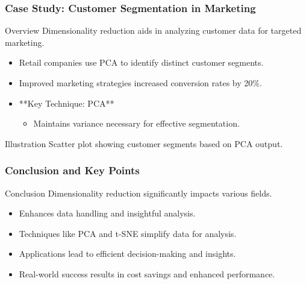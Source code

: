 \documentclass[aspectratio=169]{beamer}
\begin{document}
\begin{frame}[fragile]
    \frametitle{Case Study: Customer Segmentation in Marketing}
    \begin{block}{Overview}
        Dimensionality reduction aids in analyzing customer data for targeted marketing.
    \end{block}
    \begin{itemize}
        \item Retail companies use PCA to identify distinct customer segments.
        \item Improved marketing strategies increased conversion rates by 20\%.
        \item **Key Technique: PCA**
          \begin{itemize}
              \item Maintains variance necessary for effective segmentation.
          \end{itemize}
    \end{itemize}
    \begin{block}{Illustration}
        Scatter plot showing customer segments based on PCA output.
    \end{block}
\end{frame}

\begin{frame}[fragile]
    \frametitle{Conclusion and Key Points}
    \begin{block}{Conclusion}
        Dimensionality reduction significantly impacts various fields.
        \begin{itemize}
            \item Enhances data handling and insightful analysis.
        \end{itemize}
    \end{block}
    \begin{itemize}
        \item Techniques like PCA and t-SNE simplify data for analysis.
        \item Applications lead to efficient decision-making and insights.
        \item Real-world success results in cost savings and enhanced performance.
    \end{itemize}
\end{frame}
\end{document}
